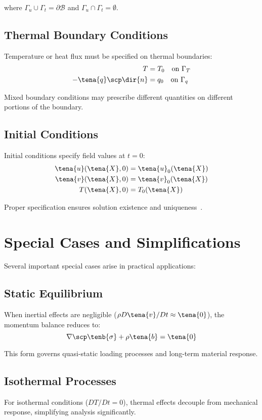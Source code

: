 where $\Gamma_u \cup \Gamma_t = \partial \mathcal{B}$ and $\Gamma_u \cap \Gamma_t = \emptyset$.

\subsection{Thermal Boundary Conditions}
Temperature or heat flux must be specified on thermal boundaries:
\begin{align}
T &= T_0 \quad \text{on } \Gamma_T\\
-\tena{q} \scp \dir{n} &= q_0 \quad \text{on } \Gamma_q
\end{align}

Mixed boundary conditions may prescribe different quantities on different portions of the boundary.

\subsection{Initial Conditions}
Initial conditions specify field values at $t = 0$:
\begin{align}
\tena{u}(\tena{X}, 0) &= \tena{u}_0(\tena{X})\\
\tena{v}(\tena{X}, 0) &= \tena{v}_0(\tena{X})\\
T(\tena{X}, 0) &= T_0(\tena{X})
\end{align}

Proper specification ensures solution existence and uniqueness~\autocite{Sadd.2019}.

\section{Special Cases and Simplifications}

Several important special cases arise in practical applications:

\subsection{Static Equilibrium}
When inertial effects are negligible ($\rho D\tena{v}/Dt \approx \tena{0}$), the momentum balance reduces to:
\begin{equation}
\nabla \scp \tenb{\sigma} + \rho \tena{b} = \tena{0}
\end{equation}

This form governs quasi-static loading processes and long-term material response.

\subsection{Isothermal Processes}
For isothermal conditions ($DT/Dt = 0$), thermal effects decouple from mechanical response, simplifying analysis significantly.

